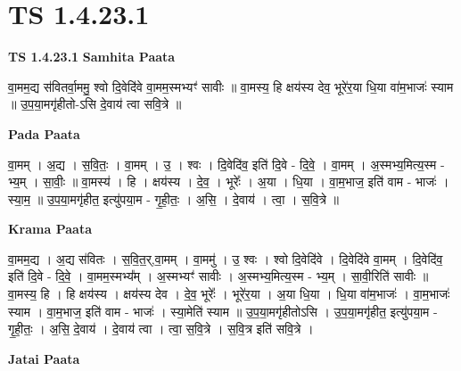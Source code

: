 \documentclass[17pt]{extarticle}
\begin{document}
\section{ TS 1.4.23.1 }

\textbf{TS 1.4.23.1 } \newline
\textbf{Samhita Paata} \newline

वा॒मम॒द्य स॑वितर्वा॒ममु॒ श्वो दि॒वेदि॑वे वा॒मम॒स्मभ्यꣳ॑ सावीः ॥ वा॒मस्य॒ हि क्षय॑स्य देव॒ भूरे॑र॒या धि॒या वा॑म॒भाजः॑ स्याम ॥ उ॒प॒या॒मगृ॑हीतो-ऽसि दे॒वाय॑ त्वा सवि॒त्रे ॥ \newline

\textbf{Pada Paata} \newline

वा॒मम् । अ॒द्य । स॒वि॒तः॒ । वा॒मम् । उ॒ । श्वः । दि॒वेदि॑व॒ इति॑ दि॒वे - दि॒वे॒ । वा॒मम् । अ॒स्मभ्य॒मित्य॒स्म - भ्य॒म् । सा॒वीः॒ ॥ वा॒मस्य॑ । हि । क्षय॑स्य । दे॒व॒ । भूरेः᳚ । अ॒या । धि॒या । वा॒म॒भाज॒ इति॑ वाम - भाजः॑ । स्या॒म॒ ॥ उ॒प॒या॒मगृ॑हीत॒ इत्यु॑पया॒म - गृ॒ही॒तः॒ । अ॒सि॒ । दे॒वाय॑ । त्वा॒ । स॒वि॒त्रे ॥  \newline


\textbf{Krama Paata} \newline

वा॒मम॒द्य । अ॒द्य स॑वितः । स॒वि॒त॒र्,वा॒मम् । वा॒ममु॑ । उ॒ श्वः । श्वो दि॒वेदि॑वे । दि॒वेदि॑वे वा॒मम् । दि॒वेदि॑व॒ इति॑ दि॒वे - दि॒वे॒ । वा॒मम॒स्मभ्य᳚म् । अ॒स्मभ्यꣳ॑ सावीः । अ॒स्मभ्य॒मित्य॒स्म - भ्य॒म् । सा॒वी॒रिति॑ सावीः ॥ वा॒मस्य॒ हि । हि क्षय॑स्य । क्षय॑स्य देव । दे॒व॒ भूरेः᳚ । भूरे॑र॒या । अ॒या धि॒या । धि॒या वा॑म॒भाजः॑ । वा॒म॒भाजः॑ स्याम । वा॒म॒भाज॒ इति॑ वाम - भाजः॑ । स्या॒मेति॑ स्याम ॥ उ॒प॒या॒मगृ॑हीतोऽसि । उ॒प॒या॒मगृ॑हीत॒ इत्यु॑पया॒म - गृ॒ही॒तः॒ । अ॒सि॒ दे॒वाय॑ । दे॒वाय॑ त्वा । त्वा॒ स॒वि॒त्रे । स॒वि॒त्र इति॑ सवि॒त्रे । \newline

\textbf{Jatai Paata} \newline
\end{document}
